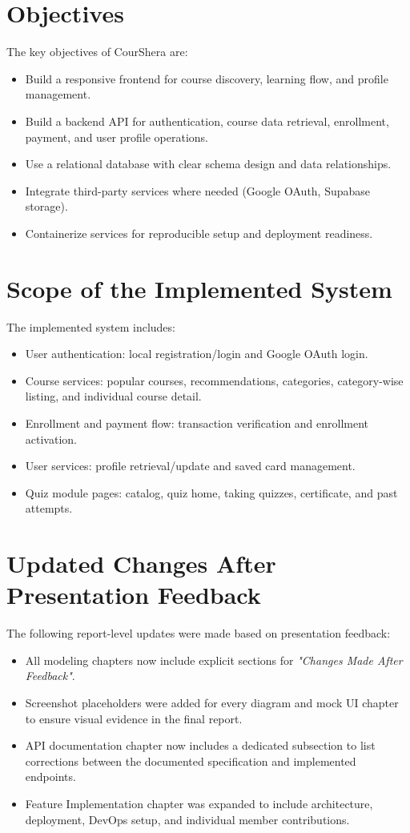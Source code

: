 \documentclass[12pt,a4paper]{report}
\begin{document}
\section{Objectives}
The key objectives of CourShera are:
\begin{itemize}[leftmargin=*]
  \item Build a responsive frontend for course discovery, learning flow, and profile management.
  \item Build a backend API for authentication, course data retrieval, enrollment, payment, and user profile operations.
  \item Use a relational database with clear schema design and data relationships.
  \item Integrate third-party services where needed (Google OAuth, Supabase storage).
  \item Containerize services for reproducible setup and deployment readiness.
\end{itemize}

\section{Scope of the Implemented System}
The implemented system includes:
\begin{itemize}[leftmargin=*]
  \item User authentication: local registration/login and Google OAuth login.
  \item Course services: popular courses, recommendations, categories, category-wise listing, and individual course detail.
  \item Enrollment and payment flow: transaction verification and enrollment activation.
  \item User services: profile retrieval/update and saved card management.
  \item Quiz module pages: catalog, quiz home, taking quizzes, certificate, and past attempts.
\end{itemize}

\section{Updated Changes After Presentation Feedback}
The following report-level updates were made based on presentation feedback:
\begin{itemize}[leftmargin=*]
  \item All modeling chapters now include explicit sections for \textit{"Changes Made After Feedback"}.
  \item Screenshot placeholders were added for every diagram and mock UI chapter to ensure visual evidence in the final report.
  \item API documentation chapter now includes a dedicated subsection to list corrections between the documented specification and implemented endpoints.
  \item Feature Implementation chapter was expanded to include architecture, deployment, DevOps setup, and individual member contributions.
\end{itemize}
\end{document}
